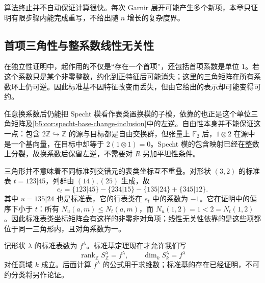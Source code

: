 \ProseParagraphBreak
算法终止并不自动保证计算很快。每次 Garnir 展开可能产生多个新项，本章只证明有限步骤内能完成重写，不给出随 \(n\) 增长的复杂度界。

\subsection{首项三角性与整系数线性无关性}
\label{b5:subsec:0603:03}

在独立性证明中，起作用的不仅是“存在一个首项”，还包括首项系数是单位 \(1\)。若这个系数只是某个非零整数，约化到正特征后可能消失；这里的三角矩阵在所有系数环上仍可逆。因此标准基不因特征改变而丢失，但由它给出的表示却可能变得可约。

\ProseParagraphBreak
任意换系数后仍能把 Specht 模看作表类置换模的子模，依靠的也正是这个单位三角矩阵及\cref{b5:cor:specht-base-change-inclusion}中的左逆。自由性本身并不能保证这一点：包含 \(2\mathbb Z\hookrightarrow\mathbb Z\) 的源与目标都是自由交换群，但张量上 \(\mathbb F_2\) 后，\(1\otimes2\) 在源中是一个基向量，在目标中却等于 \(2(1\otimes1)=0\)。Specht 模的包含映射已经在整数上分裂，故换系数后保留左逆，不需要对 \(R\) 另加平坦性条件。

\ProseParagraphBreak
三角形并不意味着不同标准列交错元的表类坐标互不重叠。对形状 \((3,2)\) 的标准表 \(t=123|45\)，列群由 \((14),(25)\) 生成，故
\[
	e_t=\{123|45\}-\{234|15\} -\{135|24\}+\{345|12\}.
\]
其中 \(u=135|24\) 也是标准表，它的行表类在 \(e_t\) 中的系数为 \(-1\)。它在证明中的偏序下小于 \(t\)：所有 \(N_u(a,m)\le N_t(a,m)\)，而 \(N_u(1,2)=1<2=N_t(1,2)\)。因此标准表类坐标矩阵会有这样的非零非对角项；线性无关性依靠的是这些项都位于同一三角形内，且对角系数为一。

\ProseParagraphBreak

记形状 \(\lambda\) 的标准表数为 \(f^\lambda\)。标准基定理现在才允许我们写
\[
	\operatorname{rank}_{\mathbb Z}S_{\mathbb Z}^\lambda=f^\lambda, \qquad \dim_kS_k^\lambda=f^\lambda
\]
对任意域 \(k\) 成立。后面计算 \(f^\lambda\) 的公式用于求维数；标准基的存在已经证明，不可约分类将另作论证。

